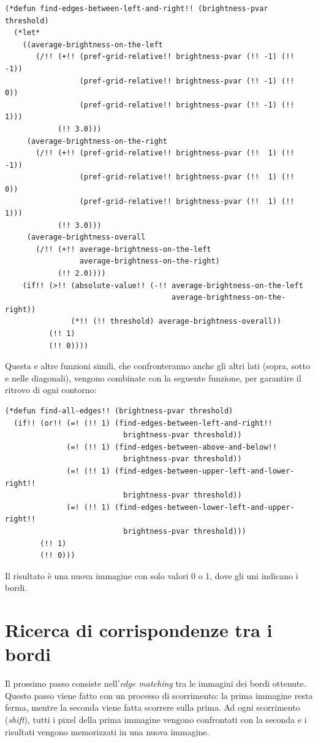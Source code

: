 \documentclass[12pt,a4paper,openright,twoside]{report}
\begin{document}
\begin{lstlisting}[style=mystyle]
(*defun find-edges-between-left-and-right!! (brightness-pvar threshold)
  (*let*
    ((average-brightness-on-the-left
       (/!! (+!! (pref-grid-relative!! brightness-pvar (!! -1) (!! -1))
                 (pref-grid-relative!! brightness-pvar (!! -1) (!!  0))
                 (pref-grid-relative!! brightness-pvar (!! -1) (!!  1)))
            (!! 3.0)))
     (average-brightness-on-the-right
       (/!! (+!! (pref-grid-relative!! brightness-pvar (!!  1) (!! -1))
                 (pref-grid-relative!! brightness-pvar (!!  1) (!!  0))
                 (pref-grid-relative!! brightness-pvar (!!  1) (!!  1)))
            (!! 3.0)))
     (average-brightness-overall
       (/!! (+!! average-brightness-on-the-left
                 average-brightness-on-the-right)
            (!! 2.0))))
    (if!! (>!! (absolute-value!! (-!! average-brightness-on-the-left
                                      average-brightness-on-the-right))
               (*!! (!! threshold) average-brightness-overall))
          (!! 1)
          (!! 0))))
\end{lstlisting}

Questa e altre funzioni simili, che confronteranno anche gli altri lati (sopra, sotto e nelle diagonali), vengono combinate con la seguente funzione, per garantire il ritrovo di ogni contorno:

\begin{lstlisting}[style=mystyle]
(*defun find-all-edges!! (brightness-pvar threshold)
  (if!! (or!! (=! (!! 1) (find-edges-between-left-and-right!!
                           brightness-pvar threshold))
              (=! (!! 1) (find-edges-between-above-and-below!!
                           brightness-pvar threshold))
              (=! (!! 1) (find-edges-between-upper-left-and-lower-right!!
                           brightness-pvar threshold))
              (=! (!! 1) (find-edges-between-lower-left-and-upper-right!!
                           brightness-pvar threshold)))
        (!! 1)
        (!! 0)))
\end{lstlisting}

Il risultato è una nuova immagine con solo valori 0 o 1, dove gli uni indicano i bordi.

\section{Ricerca di corrispondenze tra i bordi}

Il prossimo passo consiste nell'\textit{edge matching} tra le immagini dei bordi ottenute. Questo passo viene fatto con un processo di scorrimento: la prima immagine resta ferma, mentre la seconda viene fatta scorrere sulla prima. Ad ogni scorrimento (\textit{shift}), tutti i pixel della prima immagine vengono confrontati con la seconda e i risultati vengono memorizzati in una nuova immagine.
\end{document}
